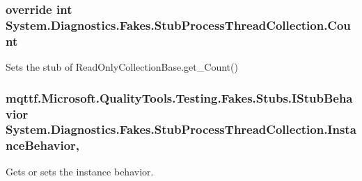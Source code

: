 \hypertarget{class_system_1_1_diagnostics_1_1_fakes_1_1_stub_process_thread_collection_a054e7ed15b6d19928725755079909e65}{
\subsubsection[{Count}]{\setlength{\rightskip}{0pt plus 5cm}override int System.\-Diagnostics.\-Fakes.\-Stub\-Process\-Thread\-Collection.\-Count\hspace{0.3cm}{\ttfamily [get]}}}\label{class_system_1_1_diagnostics_1_1_fakes_1_1_stub_process_thread_collection_a054e7ed15b6d19928725755079909e65}


Sets the stub of Read\-Only\-Collection\-Base.\-get\-\_\-\-Count()

\hypertarget{class_system_1_1_diagnostics_1_1_fakes_1_1_stub_process_thread_collection_ac6ccdd690d1ec23c4fb1fafa9b01dcce}{
\subsubsection[{Instance\-Behavior}]{\setlength{\rightskip}{0pt plus 5cm}mqttf.\-Microsoft.\-Quality\-Tools.\-Testing.\-Fakes.\-Stubs.\-I\-Stub\-Behavior System.\-Diagnostics.\-Fakes.\-Stub\-Process\-Thread\-Collection.\-Instance\-Behavior\hspace{0.3cm}{\ttfamily [get]}, {\ttfamily [set]}}}\label{class_system_1_1_diagnostics_1_1_fakes_1_1_stub_process_thread_collection_ac6ccdd690d1ec23c4fb1fafa9b01dcce}


Gets or sets the instance behavior.

